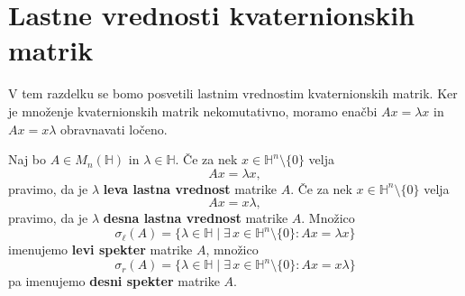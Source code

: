 \documentclass[mat1, tisk]{fmfdelo}
\numberwithin{equation}{section}
\begin{document}
\section{Lastne vrednosti kvaternionskih matrik}
V tem razdelku se bomo posvetili lastnim vrednostim kvaternionskih matrik. Ker je množenje kvaternionskih matrik nekomutativno,
moramo enačbi $Ax = \lambda x$ in $Ax = x \lambda$ obravnavati ločeno.

\begin{definicija}
    Naj bo $A \in M_{n} (\mathbb{H})$ in $\lambda \in \mathbb{H}$. Če za nek $x \in \mathbb{H}^{n}\setminus\{0\}$ velja
    \[ Ax = \lambda x, \]
    pravimo, da je $\lambda$ \textbf{leva lastna vrednost} matrike $A$. Če za nek $x \in \mathbb{H}^{n}\setminus\{0\}$ velja
    \[ Ax = x \lambda, \]
    pravimo, da je $\lambda$ \textbf{desna lastna vrednost} matrike $A$. Množico
    \[ \sigma_{\ell}(A) = \{\lambda \in \mathbb{H} \mid \exists \, x \in \mathbb{H}^{n}\setminus \{0\}: Ax = \lambda x \} \]
    imenujemo \textbf{levi spekter} matrike $A$, množico
    \[ \sigma_{r}(A) = \{\lambda \in \mathbb{H} \mid \exists \, x \in \mathbb{H}^{n}\setminus \{0\}: Ax = x \lambda \} \]
    pa imenujemo \textbf{desni spekter} matrike $A$.
\end{definicija}
\end{document}
